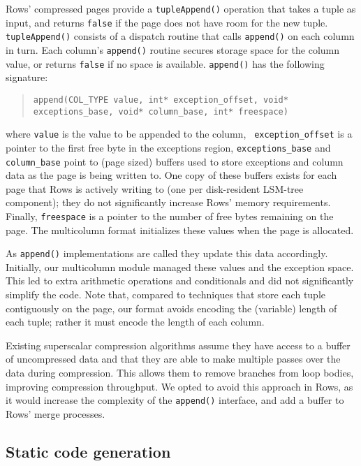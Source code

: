 \documentclass{sig-alternate-sigmod08}
\newcommand{\rows}{Rows\xspace}
\newcommand{\rowss}{Rows'\xspace}
\begin{document}
\rowss compressed pages provide a {\tt tupleAppend()} operation that
takes a tuple as input, and returns {\tt false} if the page does not have
room for the new tuple.  {\tt tupleAppend()} consists of a dispatch
routine that calls {\tt append()} on each column in turn.  Each
column's {\tt append()} routine secures storage space for the column
value, or returns {\tt false} if no space is available.  {\tt append()} has the
following signature:
\begin{quote}
  {\tt append(COL\_TYPE value, int* exception\_offset,
       void* exceptions\_base, void* column\_base, int* freespace) }
\end{quote}
where {\tt value} is the value to be appended to the column, {\tt
  exception\_offset} is a pointer to the first free byte in the
exceptions region, {\tt exceptions\_base} and {\tt column\_base} point
to (page sized) buffers used to store exceptions and column data as
the page is being written to.  One copy of these buffers exists for
each page that \rows is actively writing to (one per disk-resident
LSM-tree component); they do not significantly increase \rowss memory
requirements.  Finally, {\tt freespace} is a pointer to the number of
free bytes remaining on the page.  The multicolumn format initializes
these values when the page is allocated.

As {\tt append()} implementations are called they update this data
accordingly.  Initially, our multicolumn module managed these values
and the exception space.  This led to extra arithmetic operations and
conditionals and did not significantly simplify the code.  Note that,
compared to techniques that store each tuple contiguously on the page,
our format avoids encoding the (variable) length of each tuple; rather
it must encode the length of each column.


Existing superscalar compression algorithms assume they have access to
a buffer of uncompressed data and that they are able to make multiple
passes over the data during compression.  This allows them to remove
branches from loop bodies, improving compression throughput.  We opted
to avoid this approach in \rows, as it would increase the complexity
of the {\tt append()} interface, and add a buffer to \rowss merge processes.

\subsection{Static code generation}
\end{document}
